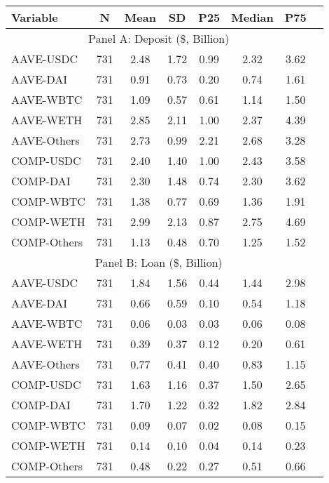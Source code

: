 \begin{table}[ht!]
\begin{tabular*}{\linewidth}{@{\extracolsep{\fill}}lccccccc}
    \toprule
    Variable  & N & Mean & SD & P25 & Median & P75 \\
    \midrule
    \multicolumn{7}{c}{Panel A: Deposit (\$, Billion)} \\
    \midrule
    AAVE-USDC  & 731   & 2.48  & 1.72  & 0.99  & 2.32  & 3.62 \\[2pt]
    AAVE-DAI  & 731   & 0.91  & 0.73  & 0.20  & 0.74  & 1.61 \\[2pt]
    AAVE-WBTC  & 731   & 1.09  & 0.57  & 0.61  & 1.14  & 1.50 \\[2pt]
    AAVE-WETH  & 731   & 2.85  & 2.11  & 1.00  & 2.37  & 4.39 \\[2pt]
    AAVE-Others  & 731   & 2.73  & 0.99  & 2.21  & 2.68  & 3.28 \\[2pt]
    COMP-USDC  & 731   & 2.40  & 1.40  & 1.00  & 2.43  & 3.58 \\[2pt]
    COMP-DAI  & 731   & 2.30  & 1.48  & 0.74  & 2.30  & 3.62 \\[2pt]
    COMP-WBTC  & 731   & 1.38  & 0.77  & 0.69  & 1.36  & 1.91 \\[2pt]
    COMP-WETH  & 731   & 2.99  & 2.13  & 0.87  & 2.75  & 4.69 \\[2pt]
    COMP-Others  & 731   & 1.13  & 0.48  & 0.70  & 1.25  & 1.52 \\
    \midrule
    \multicolumn{7}{c}{Panel B: Loan (\$, Billion)} \\
    \midrule
    AAVE-USDC  & 731   & 1.84  & 1.56  & 0.44  & 1.44  & 2.98 \\[2pt]
    AAVE-DAI  & 731   & 0.66  & 0.59  & 0.10  & 0.54  & 1.18 \\[2pt]
    AAVE-WBTC  & 731   & 0.06  & 0.03  & 0.03  & 0.06  & 0.08 \\[2pt]
    AAVE-WETH  & 731   & 0.39  & 0.37  & 0.12  & 0.20  & 0.61 \\[2pt]
    AAVE-Others  & 731   & 0.77  & 0.41  & 0.40  & 0.83  & 1.15 \\[2pt]
    COMP-USDC  & 731   & 1.63  & 1.16  & 0.37  & 1.50  & 2.65 \\[2pt]
    COMP-DAI  & 731   & 1.70  & 1.22  & 0.32  & 1.82  & 2.84 \\[2pt]
    COMP-WBTC  & 731   & 0.09  & 0.07  & 0.02  & 0.08  & 0.15 \\[2pt]
    COMP-WETH  & 731   & 0.14  & 0.10  & 0.04  & 0.14  & 0.23 \\[2pt]
    COMP-Others  & 731   & 0.48  & 0.22  & 0.27  & 0.51  & 0.66 \\
    \bottomrule

          \end{tabular*} 



\end{table}%

